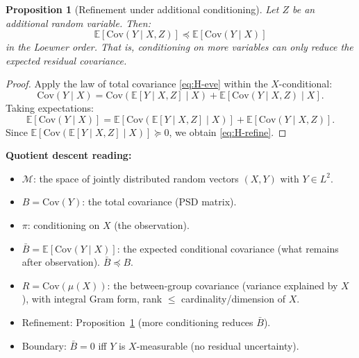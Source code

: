 \documentclass[11pt,a4paper]{article}
\numberwithin{equation}{section}
\theoremstyle{thmcompact}
\newtheorem{proposition}[theorem]{Proposition}
\theoremstyle{remark}
\begin{document}
\begin{proposition}[Refinement under additional conditioning]\label{prop:bridge-H-refine}
Let $Z$ be an additional random variable. Then:
\begin{equation}\label{eq:H-refine}
\mathbb{E}[\mathrm{Cov}(Y \mid X, Z)] \preceq \mathbb{E}[\mathrm{Cov}(Y \mid X)]
\end{equation}
in the Loewner order. That is, conditioning on more variables can only reduce the expected residual covariance.
\end{proposition}

\begin{proof}
Apply the law of total covariance \eqref{eq:H-eve} within the $X$-conditional:
\[
\mathrm{Cov}(Y \mid X) = \mathrm{Cov}(\mathbb{E}[Y \mid X, Z] \mid X) + \mathbb{E}[\mathrm{Cov}(Y \mid X, Z) \mid X].
\]
Taking expectations:
\[
\mathbb{E}[\mathrm{Cov}(Y \mid X)] = \mathbb{E}[\mathrm{Cov}(\mathbb{E}[Y \mid X, Z] \mid X)] + \mathbb{E}[\mathrm{Cov}(Y \mid X, Z)].
\]
Since $\mathbb{E}[\mathrm{Cov}(\mathbb{E}[Y \mid X, Z] \mid X)] \succeq 0$, we obtain \eqref{eq:H-refine}.
\end{proof}

\textbf{Quotient descent reading:}
\begin{itemize}[leftmargin=2em]
\item $\mathcal{M}$: the space of jointly distributed random vectors $(X, Y)$ with $Y \in L^2$.
\item $B = \mathrm{Cov}(Y)$: the total covariance (PSD matrix).
\item $\pi$: conditioning on $X$ (the observation).
\item $\bar{B} = \mathbb{E}[\mathrm{Cov}(Y \mid X)]$: the expected conditional covariance (what remains after observation). $\bar{B} \preceq B$.
\item $R = \mathrm{Cov}(\mu(X))$: the between-group covariance (variance explained by $X$), with integral Gram form, rank $\leq$ cardinality/dimension of $X$.
\item Refinement: Proposition~\ref{prop:bridge-H-refine} (more conditioning reduces $\bar{B}$).
\item Boundary: $\bar{B} = 0$ iff $Y$ is $X$-measurable (no residual uncertainty).
\end{itemize}
\end{document}
